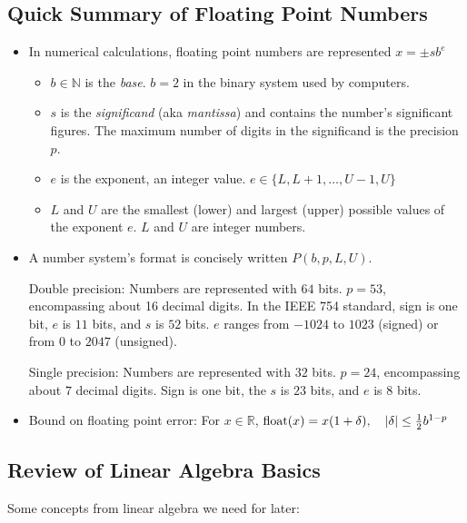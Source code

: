 \documentclass[11pt, a4paper]{article}
\newcommand{\R}{\mathbb{R}} %
\begin{document}
\subsection{Quick Summary of Floating Point Numbers}
\begin{itemize}
	\item In numerical calculations, floating point numbers are represented $ x = \pm s b^{e} $
	\begin{itemize}
		\item $ b \in \mathbb{N}$ is the \textit{base}. $ b = 2 $ in the binary system used by computers.
		\item $ s $ is the \textit{significand} (aka \textit{mantissa}) and contains the number's significant figures. The maximum number of digits in the significand is the precision $ p $.

		\item $ e $ is the exponent, an integer value. $ e \in \{L, L+1, \dots, U-1, U \} $
		
		\item $ L $ and $ U $ are the smallest (lower) and largest (upper) possible values of the exponent $ e $. $ L $ and $ U $ are integer numbers.
	\end{itemize}
	
	\item A number system's format is concisely written $ P(b, p, L, U) $. 
	
	Double precision: Numbers are represented with $ 64 $ bits. $ p = 53 $, encompassing about 16 decimal digits. In the IEEE 754 standard, sign is one bit, $ e $ is $ 11 $ bits, and $ s $ is $ 52 $ bits. $ e $ ranges from $ -1024 $ to $ 1023 $ (signed) or from $ 0 $ to $ 2047 $ (unsigned).
	
	Single precision: Numbers are represented with $ 32 $ bits.	$ p = 24 $, encompassing about $ 7 $ decimal digits. Sign is one bit, the $ s $ is $ 23 $ bits, and $ e $ is 8 bits.
	
	\item Bound on floating point error: For $ x \in \R $, $ \operatorname{float}(x) = x(1 + \delta), \quad \abs{\delta} \leq \frac{1}{2} b^{1-p} $
\end{itemize}



\subsection{Review of Linear Algebra Basics}
Some concepts from linear algebra we need for later:
\end{document}
